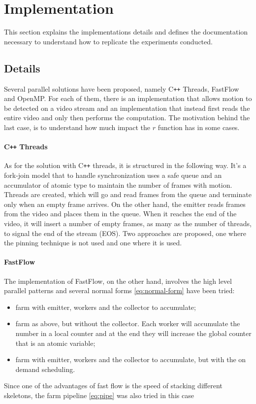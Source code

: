 \section{Implementation}
\label{sec:implementation}
This section explains the implementations details and defines the documentation necessary to understand how to replicate the experiments conducted.

\subsection{Details}
\label{sec:implementation-details}
Several parallel solutions have been proposed, namely C\texttt{++} Threads, FastFlow and OpenMP. For each of them, there is an implementation that allows motion to be detected on a video stream and an implementation that instead first reads the entire video and only then performs the computation. The motivation behind the last case, is to understand how much impact the $r$ function has in some cases.

\paragraph{C\texttt{++} Threads}
As for the solution with C\texttt{++} threads, it is structured in the following way. It's a fork-join model that to handle synchronization uses a safe queue and an accumulator of atomic type to maintain the number of frames with motion.
Threads are created, which will go and read frames from the queue and terminate only when an empty frame arrives. On the other hand, the emitter reads frames from the video and places them in the queue. When it reaches the end of the video, it will insert a number of empty frames, as many as the number of threads, to signal the end of the stream (EOS). Two approaches are proposed, one where the pinning technique is not used and one where it is used.

\paragraph{FastFlow}
The implementation of FastFlow, on the other hand, involves the high level parallel patterns and several normal forms \cref{eq:normal-form} have been tried:
\begin{itemize}
    \item farm with emitter, workers and the collector to accumulate;
    \item farm as above, but without the collector. Each worker will accumulate the number in a local counter and at the end they will increase the global counter that is an atomic variable;
    \item farm with emitter, workers and the collector to accumulate, but with the on demand scheduling.
\end{itemize}
Since one of the advantages of fast flow is the speed of stacking different skeletons, the farm pipeline \cref{eq:pipe} was also tried in this case

